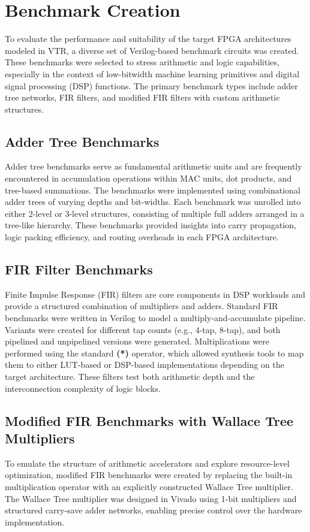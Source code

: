 \section{Benchmark Creation}
To evaluate the performance and suitability of the target FPGA architectures modeled in VTR, a diverse set of Verilog-based benchmark circuits was created. These benchmarks were selected to stress arithmetic and logic capabilities, especially in the context of low-bitwidth machine learning primitives and digital signal processing (DSP) functions. The primary benchmark types include adder tree networks, FIR filters, and modified FIR filters with custom arithmetic structures.

\subsection{Adder Tree Benchmarks}
Adder tree benchmarks serve as fundamental arithmetic units and are frequently encountered in accumulation operations within MAC units, dot products, and tree-based summations. The benchmarks were implemented using combinational adder trees of varying depths and bit-widths. Each benchmark was unrolled into either 2-level or 3-level structures, consisting of multiple full adders arranged in a tree-like hierarchy. These benchmarks provided insights into carry propagation, logic packing efficiency, and routing overheads in each FPGA architecture.

\subsection{FIR Filter Benchmarks}
Finite Impulse Response (FIR) filters are core components in DSP workloads and provide a structured combination of multipliers and adders. Standard FIR benchmarks were written in Verilog to model a multiply-and-accumulate pipeline. Variants were created for different tap counts (e.g., 4-tap, 8-tap), and both pipelined and unpipelined versions were generated. Multiplications were performed using the standard \textbf{(*)} operator, which allowed synthesis tools to map them to either LUT-based or DSP-based implementations depending on the target architecture. These filters test both arithmetic depth and the interconnection complexity of logic blocks.

\subsection{Modified FIR Benchmarks with Wallace Tree Multipliers}
To emulate the structure of arithmetic accelerators and explore resource-level optimization, modified FIR benchmarks were created by replacing the built-in multiplication operator with an explicitly constructed Wallace Tree multiplier. The Wallace Tree multiplier was designed in Vivado using 1-bit multipliers and structured carry-save adder networks, enabling precise control over the hardware implementation.

